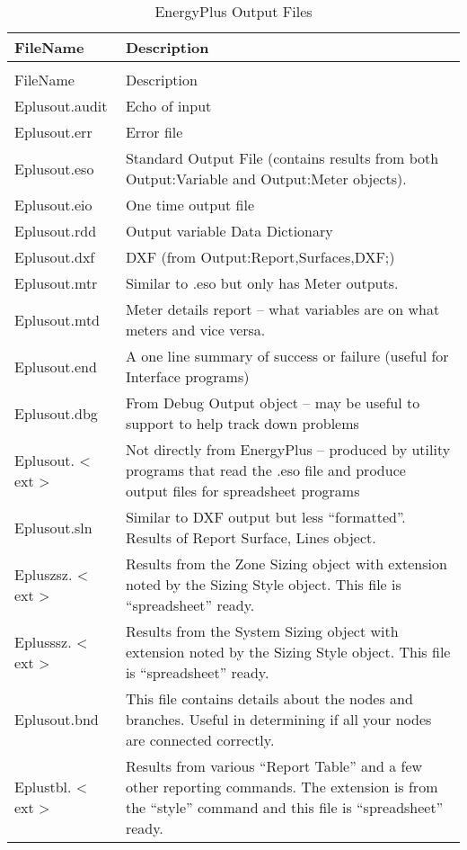 \begin{longtable}[c]{p{1.5in}p{4.5in}}
\caption{EnergyPlus Output Files \label{table:energyplus-output-files}} \tabularnewline
\toprule
FileName & Description \tabularnewline
\midrule
\endfirsthead

\caption[]{EnergyPlus Output Files} \tabularnewline
\toprule
FileName & Description \tabularnewline
\midrule
\endhead

Eplusout.audit & Echo of input \tabularnewline
Eplusout.err & Error file \tabularnewline
Eplusout.eso & Standard Output File (contains results from both Output:Variable and Output:Meter objects). \tabularnewline
Eplusout.eio & One time output file \tabularnewline
Eplusout.rdd & Output variable Data Dictionary \tabularnewline
Eplusout.dxf & DXF (from Output:Report,Surfaces,DXF;) \tabularnewline
Eplusout.mtr & Similar to .eso but only has Meter outputs. \tabularnewline
Eplusout.mtd & Meter details report – what variables are on what meters and vice versa. \tabularnewline
Eplusout.end & A one line summary of success or failure (useful for Interface programs) \tabularnewline
Eplusout.dbg & From Debug Output object – may be useful to support to help track down problems \tabularnewline
Eplusout. < ext > & Not directly from EnergyPlus – produced by utility programs that read the .eso file and produce output files for spreadsheet programs \tabularnewline
Eplusout.sln & Similar to DXF output but less “formatted”. Results of Report Surface, Lines object. \tabularnewline
Epluszsz. < ext > & Results from the Zone Sizing object with extension noted by the Sizing Style object. This file is “spreadsheet” ready. \tabularnewline
Eplusssz. < ext > & Results from the System Sizing object with extension noted by the Sizing Style object. This file is “spreadsheet” ready. \tabularnewline
Eplusout.bnd & This file contains details about the nodes and branches. Useful in determining if all your nodes are connected correctly. \tabularnewline
Eplustbl. < ext > & Results from various “Report Table” and a few other reporting commands. The extension is from the “style” command and this file is “spreadsheet” ready. \tabularnewline
\bottomrule
\end{longtable}